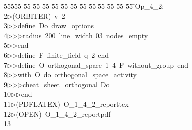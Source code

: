 %
%
\begin{tabbing}
55555 \= 55 \= 55 \= 55 \= 55 \= 55 \= 55 \= 55 \= 55 \= 55 \= 55 \= 55 \= 55 \= \>Op\_4\_2:\\[0pt]
2\>$\triangleright$\>(ORBITER)\ v\ 2\ \\[0pt]
3\>$\triangleright$\>$\triangleright$\>define\ Do\ draw\_options\ \\[0pt]
4\>$\triangleright$\>$\triangleright$\>$\triangleright$\>radius\ 200\ line\_width\ 03\ nodes\_empty\ \\[0pt]
5\>$\triangleright$\>$\triangleright$\>end\ \\[0pt]
6\>$\triangleright$\>$\triangleright$\>define\ F\ finite\_field\ q\ 2\ end\ \\[0pt]
7\>$\triangleright$\>$\triangleright$\>define\ O\ orthogonal\_space\ 1\ 4\ F\ without\_group\ end\ \\[0pt]
8\>$\triangleright$\>$\triangleright$\>with\ O\ do\ orthogonal\_space\_activity\ \\[0pt]
9\>$\triangleright$\>$\triangleright$\>$\triangleright$\>cheat\_sheet\_orthogonal\ Do\ \\[0pt]
10\>$\triangleright$\>$\triangleright$\>end\\[0pt]
11\>$\triangleright$\>(PDFLATEX)\ O\_1\_4\_2\_reporttex\ \\[0pt]
12\>$\triangleright$\>(OPEN)\ O\_1\_4\_2\_reportpdf\\[0pt]
13\>\end{tabbing}
